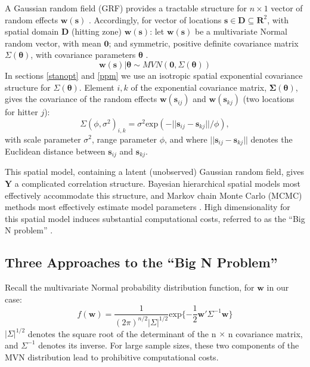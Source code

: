 A Gaussian random field (GRF) provides a tractable structure for $n \times 1$ vector of random effects $\pmb{w}(\pmb{s})$ \citep{Gelfand2010}. Accordingly, for vector of locations $\pmb{s} \in \pmb{D} \subseteq \pmb{R}^{2}$, with spatial domain $\pmb{D}$ (hitting zone) $\pmb{w}(\pmb{s})$: let $\pmb{w}(\pmb{s})$ be a multivariate Normal random vector, with mean $\pmb{0}$; and symmetric, positive definite covariance matrix $\Sigma(\pmb{\theta})$, with covariance parameters $\pmb{\theta}$ \citep{Haran2011}.
\begin{equation} \label{eq:w}
\pmb{w}(\pmb{s}) | \pmb{\theta} \sim MVN(\pmb{0}, \Sigma(\pmb{\theta})) 
\end{equation}
In sections \ref{stanopt} and \ref{ppm} we use an isotropic spatial exponential covariance structure for $\Sigma(\pmb{\theta})$. Element $i,k$ of the exponential covariance matrix, $\pmb{\Sigma}(\pmb{\theta})$, gives the covariance of the random effects $\pmb{w}(\pmb{s}_{ij})$ and $\pmb{w}(\pmb{s}_{kj})$ (two locations for hitter $j$):
\begin{equation} \label{eq:exp}
\Sigma(\phi, \sigma^{2})_{i,k} = \sigma^{2} \text{exp}(-||\pmb{s}_{ij} - \pmb{s}_{kj}||/\phi),
\end{equation}
with scale parameter $\sigma^{2}$, range parameter $\phi$, and where $||\pmb{s}_{ij} - \pmb{s}_{kj}||$ denotes the Euclidean distance between $\pmb{s}_{ij}$ and $\pmb{s}_{kj}$.

This spatial model, containing a latent (unobserved) Gaussian random field, gives $\pmb{Y}$ a complicated correlation structure. Bayesian hierarchical spatial models most effectively accommodate this structure, and Markov chain Monte Carlo (MCMC) methods most effectively estimate model parameters \citep{Banerjee2014}. High dimensionality for this spatial model induces substantial computational costs, referred to as the ``Big N problem'' \citep{Lindgren2011}.

\subsection{Three Approaches to the ``Big N Problem''}

Recall the multivariate Normal probability distribution function, for $\pmb{w}$ in our case:
\begin{equation} \label{eq:mvn}
f(\pmb{w}) = \frac{1}{(2\pi)^{n/2}|\Sigma|^{1/2}} \text{exp}\{ -\frac{1}{2}\pmb{w}'\Sigma^{-1}\pmb{w} \}
\end{equation}
$|\Sigma|^{1/2}$ denotes the square root of the determinant of the n $\times$ n covariance matrix, and $\Sigma^{-1}$ denotes its inverse. For large sample sizes, these two components of the MVN distribution lead to prohibitive computational costs.

